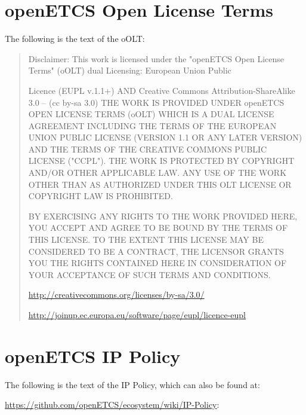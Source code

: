 \documentclass{template/openetcs_report}
\begin{document}
\appendix

\chapter{openETCS Open License Terms}
\label{sec:oOLT}

The following is the text of the oOLT:

\begin{quote}
Disclaimer: This work is licensed under the "openETCS Open License Terms" (oOLT) dual Licensing: European Union Public

Licence (EUPL v.1.1+) AND Creative Commons Attribution-ShareAlike 3.0 – (cc by-sa 3.0)
THE WORK IS PROVIDED UNDER openETCS OPEN LICENSE TERMS (oOLT) WHICH IS A DUAL LICENSE AGREEMENT INCLUDING THE TERMS OF THE EUROPEAN UNION PUBLIC LICENSE (VERSION 1.1 OR ANY LATER VERSION) AND THE
TERMS OF THE CREATIVE COMMONS PUBLIC LICENSE ("CCPL"). THE WORK IS PROTECTED BY COPYRIGHT AND/OR
OTHER APPLICABLE LAW. ANY USE OF THE WORK OTHER THAN AS AUTHORIZED UNDER THIS OLT LICENSE OR COPYRIGHT LAW IS PROHIBITED.

BY EXERCISING ANY RIGHTS TO THE WORK PROVIDED HERE, YOU ACCEPT AND AGREE TO BE BOUND BY THE TERMS
OF THIS LICENSE. TO THE EXTENT THIS LICENSE MAY BE CONSIDERED TO BE A CONTRACT, THE LICENSOR GRANTS
YOU THE RIGHTS CONTAINED HERE IN CONSIDERATION OF YOUR ACCEPTANCE OF SUCH TERMS AND CONDITIONS.

\url{http://creativecommons.org/licenses/by-sa/3.0/}

\url{http://joinup.ec.europa.eu/software/page/eupl/licence-eupl}

\end{quote}

\chapter{openETCS IP Policy}
\label{sec:ip-policy}

The following is the text of the IP Policy, which can also be found at:

\url{https://github.com/openETCS/ecosystem/wiki/IP-Policy}:
\end{document}
